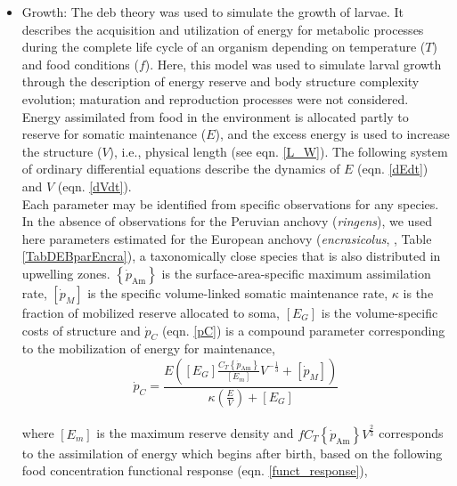 \begin{itemize}

\item Growth: The \acrshort{deb} theory \citep{Kooi2009} was used to simulate the growth of larvae. It describes the acquisition and utilization of energy for metabolic processes during the complete life cycle of an organism depending on temperature ($T$) and food conditions ($f$). Here, this model was used to simulate larval growth through the description of energy reserve and body structure complexity evolution; maturation and reproduction processes were not considered. Energy assimilated from food in the environment is allocated partly to reserve for somatic maintenance ($E$), and the excess energy is used to increase the structure ($V$), i.e., physical length (see eqn. \ref{L_W}). The following system of ordinary differential equations describe the dynamics of $E$ (eqn. \ref{dEdt}) and $V$ (eqn. \ref{dVdt}).\\

Each parameter may be identified from specific observations for any species. In the absence of observations for the Peruvian anchovy (\textit{\gls{ringens}}), we used here parameters estimated for the European anchovy (\textit{\gls{encrasicolus}}, \cite{PethRoos2013}	, Table \ref{TabDEBparEncra}), a taxonomically close species that is also distributed in upwelling zones. $\left \{ \dot{p}_\mathrm{Am} \right \}$ is the surface-area-specific maximum assimilation rate, $\left [ \dot{p}_{M} \right ]$ is the specific volume-linked somatic maintenance rate, $\kappa$ is the fraction of mobilized reserve allocated to soma, ${\left [ E_{G} \right ]}$ is the volume-specific costs of structure and $\dot{p}_{C}$ (eqn. \ref{pC}) is a compound parameter corresponding to the mobilization of energy for maintenance,\\

\begin{equation}
	\dot{p}_{C} = \frac
					   {E\left ( \left [ E_{G} \right ] \frac{C_{T}\left \{ \dot{p}_\mathrm{Am} \right \}}{\left [ E_{m} \right ]} V^{-\frac{1}{3}}+\left [ \dot{p}_{M} \right ]\right )}
					   {\kappa\left ( \frac{E}{V} \right ) + \left [ E_{G} \right ]}
	\label{pC}
\end{equation}\\

where $\left[ E_{m} \right]$ is the maximum reserve density and $fC_{T}\left \{ \dot{p}_\mathrm{Am} \right \}V^{\frac{2}{3}}$ corresponds to the assimilation of energy which begins after birth, based on the following food concentration functional response (eqn. \ref{funct_response}),\\


\end{itemize}
